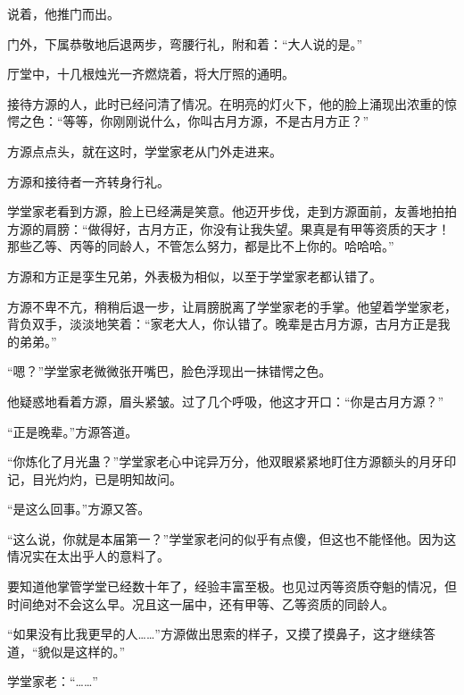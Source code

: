 \begin{this_body}
说着，他推门而出。

门外，下属恭敬地后退两步，弯腰行礼，附和着：“大人说的是。”

厅堂中，十几根烛光一齐燃烧着，将大厅照的通明。

接待方源的人，此时已经问清了情况。在明亮的灯火下，他的脸上涌现出浓重的惊愕之色：“等等，你刚刚说什么，你叫古月方源，不是古月方正？”

方源点点头，就在这时，学堂家老从门外走进来。

方源和接待者一齐转身行礼。

学堂家老看到方源，脸上已经满是笑意。他迈开步伐，走到方源面前，友善地拍拍方源的肩膀：“做得好，古月方正，你没有让我失望。果真是有甲等资质的天才！那些乙等、丙等的同龄人，不管怎么努力，都是比不上你的。哈哈哈。”

方源和方正是孪生兄弟，外表极为相似，以至于学堂家老都认错了。

方源不卑不亢，稍稍后退一步，让肩膀脱离了学堂家老的手掌。他望着学堂家老，背负双手，淡淡地笑着：“家老大人，你认错了。晚辈是古月方源，古月方正是我的弟弟。”

“嗯？”学堂家老微微张开嘴巴，脸色浮现出一抹错愕之色。

他疑惑地看着方源，眉头紧皱。过了几个呼吸，他这才开口：“你是古月方源？”

“正是晚辈。”方源答道。

“你炼化了月光蛊？”学堂家老心中诧异万分，他双眼紧紧地盯住方源额头的月牙印记，目光灼灼，已是明知故问。

“是这么回事。”方源又答。

“这么说，你就是本届第一？”学堂家老问的似乎有点傻，但这也不能怪他。因为这情况实在太出乎人的意料了。

要知道他掌管学堂已经数十年了，经验丰富至极。也见过丙等资质夺魁的情况，但时间绝对不会这么早。况且这一届中，还有甲等、乙等资质的同龄人。

“如果没有比我更早的人……”方源做出思索的样子，又摸了摸鼻子，这才继续答道，“貌似是这样的。”

学堂家老：“……”

\end{this_body}

